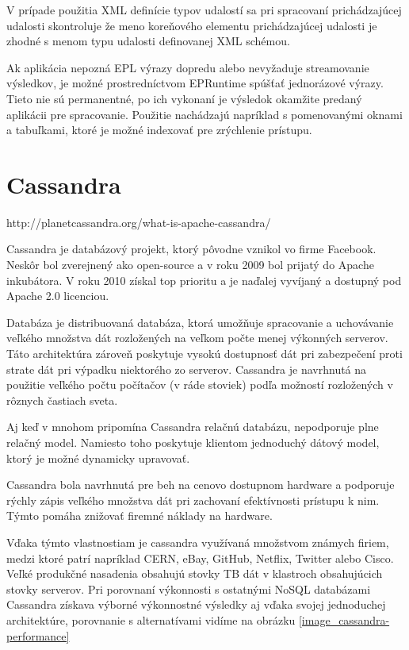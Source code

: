 		V prípade použitia XML definície typov udalostí sa pri spracovaní prichádzajúcej udalosti skontroluje že meno koreňového elementu prichádzajúcej udalosti je zhodné s menom typu udalosti definovanej XML schémou.
		
		Ak aplikácia nepozná EPL výrazy dopredu alebo nevyžaduje streamovanie výsledkov, je možné prostredníctvom EPRuntime spúšťať jednorázové výrazy. Tieto nie sú permanentné, po ich vykonaní je výsledok okamžite predaný aplikácii pre spracovanie. Použitie nachádzajú napríklad s pomenovanými oknami a tabuľkami, ktoré je možné indexovať pre zrýchlenie prístupu.		

\section{Cassandra}
	http://planetcassandra.org/what-is-apache-cassandra/
	
	Cassandra je databázový projekt, ktorý pôvodne vznikol vo firme Facebook. Neskôr bol zverejnený ako open-source a v roku 2009 bol prijatý do Apache inkubátora. V roku 2010 získal top prioritu a je naďalej vyvíjaný a dostupný pod Apache 2.0 licenciou.
	
	Databáza je distribuovaná databáza, ktorá umožňuje spracovanie a uchovávanie veľkého množstva dát rozložených na veľkom počte menej výkonných serverov. Táto architektúra zároveň poskytuje vysokú dostupnosť dát pri zabezpečení proti strate dát pri výpadku niektorého zo serverov. Cassandra je navrhnutá na použitie veľkého počtu počítačov (v ráde stoviek) podľa možností rozložených v rôznych častiach sveta.
	
	Aj keď v mnohom pripomína Cassandra relačnú databázu, nepodporuje plne relačný model. Namiesto toho poskytuje klientom jednoduchý dátový model, ktorý je možné dynamicky upravovať.
	
	Cassandra bola navrhnutá pre beh na cenovo dostupnom hardware a podporuje rýchly zápis veľkého množstva dát pri zachovaní efektívnosti prístupu k nim. Týmto pomáha znižovať firemné náklady na hardware.
	
	Vďaka týmto vlastnostiam je cassandra využívaná množstvom známych firiem, medzi ktoré patrí napríklad CERN, eBay, GitHub, Netflix, Twitter alebo Cisco. Veľké produkčné nasadenia obsahujú stovky TB dát v klastroch obsahujúcich stovky serverov. Pri porovnaní výkonnosti s ostatnými NoSQL databázami  Cassandra získava výborné výkonnostné výsledky aj vďaka svojej jednoduchej architektúre, porovnanie s alternatívami vidíme na obrázku \ref{image_cassandra-performance}
	
